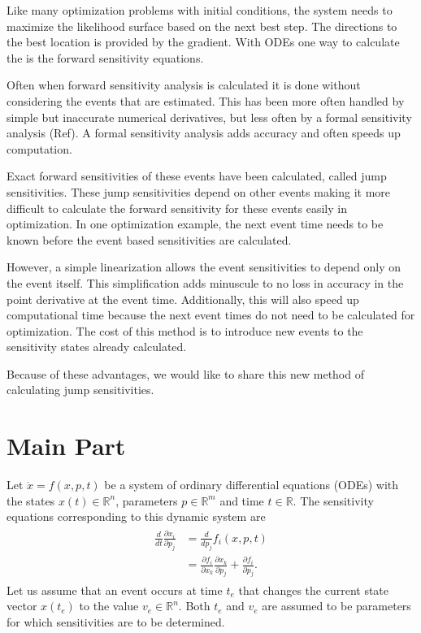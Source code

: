 \documentclass[journal, a4paper]{IEEEtran}
\begin{document}
	Like many optimization problems with initial conditions, the system needs
	to maximize the likelihood surface based on the next best step.
	The directions to the best location is provided by the gradient.
	With ODEs one way to calculate the is the forward sensitivity equations.

	Often when forward sensitivity analysis is calculated it is done without
	considering the events that are estimated.  This has been more often  handled by
	simple but inaccurate numerical derivatives, but less often by a formal
	sensitivity analysis (Ref).  A formal sensitivity analysis adds accuracy and often speeds up computation.

	Exact forward sensitivities of these events have been calculated, called jump sensitivities. These jump sensitivities depend on other events making it more difficult to calculate the forward sensitivity for these events easily in optimization.  In one optimization example, the next event time needs to be known before the event based sensitivities are calculated.

	However, a simple linearization allows the event sensitivities to depend only on the event itself.  This simplification adds minuscule to no loss in accuracy in the point derivative at the event time.  Additionally, this will also speed up computational time because the next event times do not need to be calculated for optimization.  The cost of this method is to introduce new events to the sensitivity states already calculated.

	Because of these advantages, we would like to share this new method of calculating jump sensitivities.


\section{Main Part}
\label{sec:main}
Let $\dot x = f(x, p, t)$ be a system of ordinary differential equations (ODEs) with the states $x(t) \in \mathbb R^n$, parameters $p \in \mathbb R^m$ and time $t \in \mathbb R$. The sensitivity equations corresponding to this dynamic system are
\begin{align}
\begin{aligned}
    \frac{d}{dt}\frac{\partial x_i}{\partial p_j} &= \frac{d}{dp_j} f_i(x, p, t)\\
        & = \frac{\partial f_i}{\partial x_k}\frac{\partial x_k}{\partial p_j} +
            \frac{\partial f_i}{\partial p_j}.
\end{aligned}
 \label{eq:sens}
\end{align}
Let us assume that an event occurs at time $t_e$ that changes the current state vector $x(t_e)$ to the value $v_e \in \mathbb R^n$. Both $t_e$ and $v_e$ are assumed to be parameters for which sensitivities are to be determined.
\end{document}
